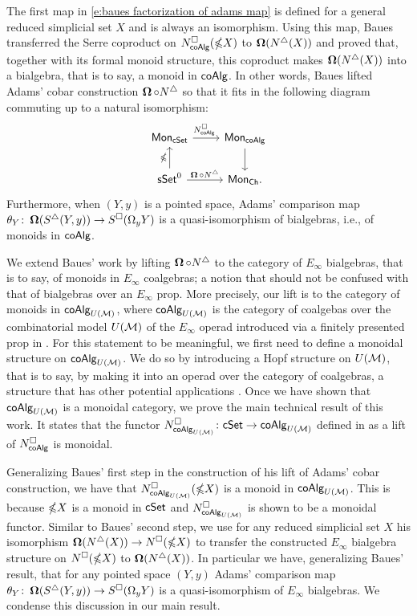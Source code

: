 The first map in \eqref{e:baues factorization of adams map} is defined for a general reduced simplicial set $X$ and is always an isomorphism.
Using this map, Baues transferred the Serre coproduct on $N^{\square}_{\mathsf{coAlg}}(\mathbb{\Omega} X)$ to $\operatorname{\mathbf{\Omega}}(N^{\triangle}(X))$ and proved that, together with its formal monoid structure, this coproduct makes $\operatorname{\mathbf{\Omega}}(N^{\triangle}(X))$ into a bialgebra, that is to say, a monoid in $\mathsf{coAlg}$.
In other words, Baues lifted Adams' cobar construction $\operatorname{\mathbf{\Omega}} \circ N^{\triangle}$ so that it fits in the following diagram commuting up to a natural isomorphism:
\begin{equation*}
\begin{tikzcd}
\Mon_{\cSet} \arrow[r, "\cchains_\coAlg \ "] & \Mon_{\coAlg} \arrow[d] \\
\sSet^0 \arrow[r, "\cobar \circ \schains"] \arrow[u, "\gcobar"] & \Mon_{\Ch}.
\end{tikzcd}
\end{equation*}
Furthermore, when $(Y, y)$ is a pointed space, Adams' comparison map $\theta_Y \colon \operatorname{\mathbf{\Omega}}(S^{\triangle}(Y, y)) \to S^{\square}(\Omega_y Y)$ is a quasi-isomorphism of bialgebras, i.e., of monoids in $\mathsf{coAlg}$.

We extend Baues' work by lifting $\operatorname{\mathbf{\Omega}} \circ N^{\triangle}$ to the category of $E_\infty$ bialgebras, that is to say, of monoids in $E_\infty$ coalgebras; a notion that should not be confused with that of bialgebras over an $E_\infty$ prop.
More precisely, our lift is to the category of monoids in $\mathsf{coAlg}_{U(\mathcal{M})}$, where $\mathsf{coAlg}_{U(\mathcal{M})}$ is the category of coalgebas over the combinatorial model $U(\mathcal{M})$ of the $E_\infty$ operad introduced via a finitely presented prop in \cite{medina2020prop1}.
For this statement to be meaningful, we first need to define a monoidal structure on $\mathsf{coAlg}_{U(\mathcal{M})}$.
We do so by introducing a Hopf structure on $U(\mathcal{M})$, that is to say, by making it into an operad over the category of coalgebras, a structure that has other potential applications \cite{livernet2008hopf}.
Once we have shown that $\mathsf{coAlg}_{U(\mathcal{M})}$ is a monoidal category, we prove the main technical result of this work.
It states that the functor $N^{\square}_{\mathsf{coAlg}_{U(\mathcal{M})}} \colon \mathsf{cSet} \to \mathsf{coAlg}_{U(\mathcal{M})}$ defined in \cite{medina2021cubical} as a lift of $N^{\square}_{\mathsf{coAlg}}$ is monoidal.

Generalizing Baues' first step in the construction of his lift of Adams' cobar construction, we have that $N^{\square}_{\mathsf{coAlg}_{U(\mathcal{M})}}(\mathbb{\Omega} X)$ is a monoid in $\mathsf{coAlg}_{U(\mathcal{M})}$.
This is because $\mathbb{\Omega} X$ is a monoid in $\mathsf{cSet}$ and $N^{\square}_{\mathsf{coAlg}_{U(\mathcal{M})}}$ is shown to be a monoidal functor.
Similar to Baues' second step, we use for any reduced simplicial set $X$ his isomorphism $\operatorname{\mathbf{\Omega}}(N^{\triangle}(X)) \to N^{\square}(\mathbb{\Omega} X)$ to transfer the constructed $E_\infty$ bialgebra structure on $N^{\square}(\mathbb{\Omega} X)$ to $\operatorname{\mathbf{\Omega}}(N^{\triangle}(X))$.
In particular we have, generalizing Baues' result, that for any pointed space $(Y, y)$ Adams' comparison map $\theta_Y \colon \operatorname{\mathbf{\Omega}}(S^{\triangle}(Y, y)) \to S^{\square}(\Omega_y Y)$ is a quasi-isomorphism of $E_\infty$ bialgebras.
We condense this discussion in our main result.

